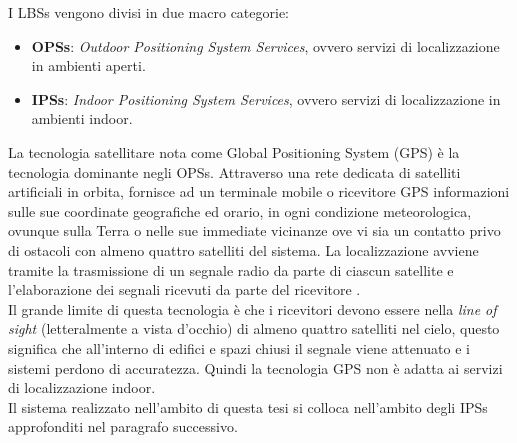 I LBSs vengono divisi in due macro categorie:
\begin{itemize}
\label{ops/ips}
	\item \textbf{OPSs}: \textit{Outdoor Positioning System Services}, ovvero servizi di localizzazione in ambienti aperti.
	\item \textbf{IPSs}: \textit{Indoor Positioning System Services}, ovvero servizi di localizzazione in ambienti indoor.
\end{itemize}
La tecnologia satellitare nota come Global Positioning System (GPS) è la tecnologia dominante negli OPSs. Attraverso una rete dedicata di satelliti artificiali in orbita, fornisce ad un terminale mobile o ricevitore GPS informazioni sulle sue coordinate geografiche ed orario, in ogni condizione meteorologica, ovunque sulla Terra o nelle sue immediate vicinanze ove vi sia un contatto privo di ostacoli con almeno quattro satelliti del sistema. La localizzazione avviene tramite la trasmissione di un segnale radio da parte di ciascun satellite e l'elaborazione dei segnali ricevuti da parte del ricevitore \cite{gps}.\\ 
Il grande limite di questa tecnologia è che i ricevitori devono essere nella \textit{line of sight} (letteralmente a vista d'occhio) di almeno quattro satelliti nel cielo, questo significa che all'interno di edifici e spazi chiusi il segnale viene attenuato e i sistemi perdono di accuratezza. Quindi la tecnologia GPS non è adatta ai servizi di localizzazione indoor.\\
Il sistema realizzato nell'ambito di questa tesi si colloca nell'ambito degli IPSs approfonditi nel paragrafo successivo.


